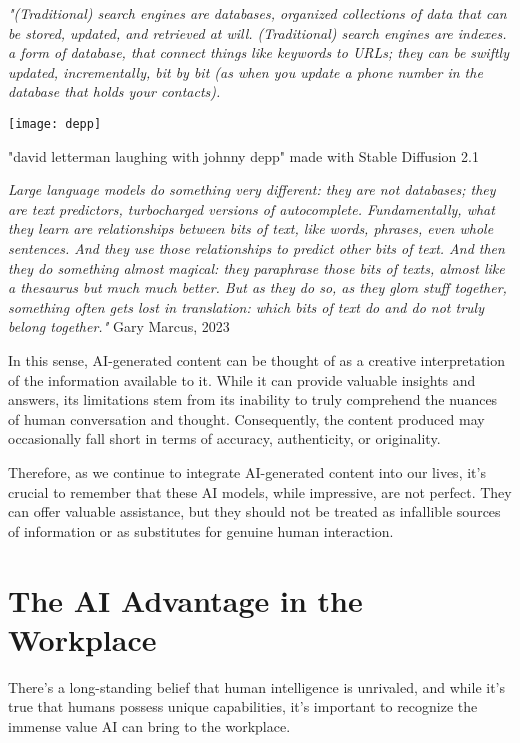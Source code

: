 \textit{"(Traditional) search engines are databases, organized collections of data that can be stored, updated, and retrieved at will. (Traditional) search engines are indexes. a form of database, that connect things like keywords to URLs; they can be swiftly updated, incrementally, bit by bit (as when you update a phone number in the database that holds your contacts).}

\begin{pdf}
\begin{marginfigure}[-5.5cm]
        \texttt{[image: depp]}
        \caption{"david letterman laughing with johnny depp" made with Stable Diffusion 2.1}
\end{marginfigure}
\end{pdf}

\textit{Large language models do something very different: they are not databases; they are text predictors, turbocharged versions of autocomplete. Fundamentally, what they learn are relationships between bits of text, like words, phrases, even whole sentences. And they use those relationships to predict other bits of text. And then they do something almost magical: they paraphrase those bits of texts, almost like a thesaurus but much much better. But as they do so, as they glom stuff together, something often gets lost in translation: which bits of text do and do not truly belong together."} Gary Marcus, 2023 

In this sense, AI-generated content can be thought of as a creative interpretation of the information available to it. While it can provide valuable insights and answers, its limitations stem from its inability to truly comprehend the nuances of human conversation and thought. Consequently, the content produced may occasionally fall short in terms of accuracy, authenticity, or originality.

Therefore, as we continue to integrate AI-generated content into our lives, it's crucial to remember that these AI models, while impressive, are not perfect. They can offer valuable assistance, but they should not be treated as infallible sources of information or as substitutes for genuine human interaction.

\section{The AI Advantage in the Workplace}

There's a long-standing belief that human intelligence is unrivaled, and while it's true that humans possess unique capabilities, it's important to recognize the immense value AI can bring to the workplace.


